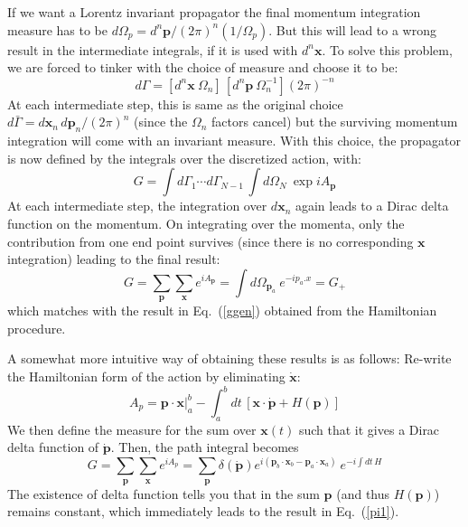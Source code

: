 \documentclass{article}
\def\eq#1{{Eq.~(\ref{#1})}}
\begin{document}
If we want a Lorentz invariant propagator the final momentum integration measure has to be $d\Omega_p=d^n \bm{p}/(2\pi)^n(1/\Omega_p)$. But this will lead to a wrong result  in the intermediate integrals, if it is used with $d^n \bm{x}$.  To solve this problem, we are forced to  tinker with the choice of measure and choose it to be:
\begin{equation}
 d\Gamma = \left[ d^n \bm{x}\ \Omega_n\right]\, \left[ d^n \bm{p} \ \Omega_n^{-1}\right](2\pi)^{-n}
 \label{measure1}
\end{equation} 
At each intermediate step, this is same as the original choice $d\bar\Gamma=d\bm{x}_n \, d\bm{p}_n/(2\pi)^n$ (since the $\Omega_n$ factors cancel) but the surviving momentum integration will come with an invariant measure.
With this choice, the propagator is now defined by the integrals over the discretized action, with:
\begin{equation}
 G=\int d \Gamma_1 \cdots d \Gamma_{N-1} \, \int d\Omega_N \ \exp i A_{\bm p}
\end{equation} 
At each intermediate step, the  integration over $d\bm{x}_n$ again leads to a Dirac delta function on the momentum.  On integrating over the momenta, only the contribution from one end point  survives (since there is no corresponding $\bm{x}$ integration) leading to the final result: 
\begin{equation}
 G=\sum_{\bm{p}} \sum_{\bm{x}} e^{iA_{\bm{p}}} = \int d\Omega_{\bm{p}_a} \ e^{-i{p}_a. {x}}=G_+
 \label{pi1}
\end{equation}
which matches with the result in \eq{ggen} obtained from the Hamiltonian procedure. 

A somewhat more intuitive way of obtaining these results is as follows: Re-write the Hamiltonian form of the action by eliminating $\dot{\bm{x}}$:
\begin{equation}
 A_p = \bm{p\cdot x}\Big|^b_a - \int_a^b dt \, \left[ \bm{x\cdot \dot{p}} + H(\bm{p})\right]
\end{equation} 
We then define the measure for the sum over $\bm{x}(t)$ such that it  gives a Dirac delta function of $\dot{\bm{p}}$. Then,  the 
 path integral becomes
\begin{equation}
 G=\sum_{\bm{p}} \sum_{\bm{x}} e^{iA_p} =   \sum_{\bm{p}} \delta(\dot{\bm{p}}) e^{i(\bm{p}_b \cdot \bm{x}_b - \bm{p}_a \cdot \bm{x}_a)} \ e^{-i \int dt\, H}
\end{equation} 
The existence of delta function tells you that in the sum $\bm{p}$ (and thus $H(\bm{p})$) remains constant, which immediately leads to the result in \eq{pi1}.
\end{document}
